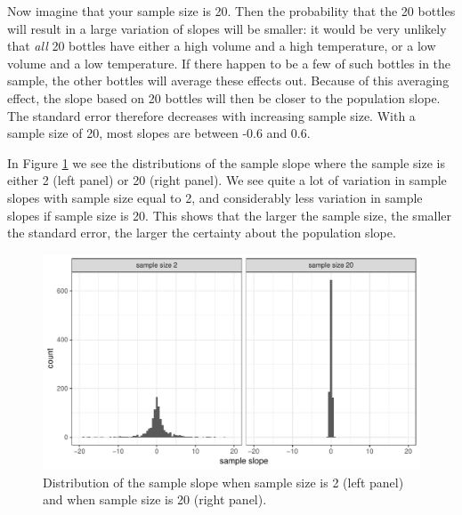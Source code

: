 \documentclass[]{report}\usepackage[]{graphicx}\usepackage[]{color}
\makeatletter
\def\maxwidth{ %
  \ifdim\Gin@nat@width>\linewidth
    \linewidth
  \else
    \Gin@nat@width
  \fi
}
\newenvironment{knitrout}{}{} %
\makeatother
\begin{document}
Now imagine that your sample size is 20. Then the probability that the 20 bottles will result in a large variation of slopes will be smaller: it would be very unlikely that \textit{all} 20 bottles have either a high volume and a high temperature, or a low volume and a low temperature. If there happen to be a few of such bottles in the sample, the other bottles will average these effects out. Because of this averaging effect, the slope based on 20 bottles will then be closer to the population slope. The standard error therefore decreases with increasing sample size. With a sample size of 20, most slopes are between -0.6 and 0.6.

In Figure \ref{fig:inf_7} we see the distributions of the sample slope where the sample size is either 2 (left panel) or 20 (right panel). We see quite a lot of variation in sample slopes with sample size equal to 2, and considerably less variation in sample slopes if sample size is 20. This shows that the larger the sample size, the smaller the standard error, the larger the certainty about the population slope. 


\begin{knitrout}
\color{fgcolor}\begin{figure}

{\centering \includegraphics[width=\maxwidth]{figure/inf_7-1} 

}

\caption[Distribution of the sample slope when sample size is 2 (left panel) and when sample size is 20 (right panel)]{Distribution of the sample slope when sample size is 2 (left panel) and when sample size is 20 (right panel).}\label{fig:inf_7}
\end{figure}


\end{knitrout}
\end{document}
